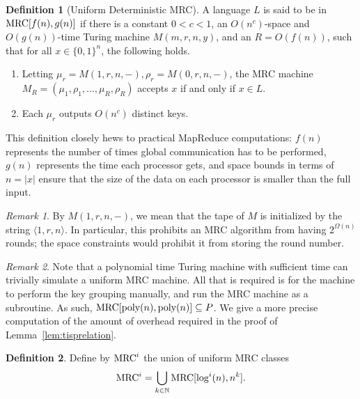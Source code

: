 \documentclass[11pt]{article}
\theoremstyle{definition}
\newtheorem{defn}{Definition}
\theoremstyle{remark}
\newtheorem{remark}{Remark}
\newcommand{\N}{\mathbb{N}}
\newcommand{\mrc}{\textup{MRC}}
\begin{document}
\begin{defn}[Uniform Deterministic MRC]

A language $L$ is said to be in $\mrc[f(n),g(n)]$ if there is a constant $0 < c
< 1$, an $O(n^c)$-space and $O(g(n))$-time Turing machine $M(m, r, n, y)$, and
an $R = O(f(n))$, such that for all $x \in \{ 0,1 \}^n$, the following holds.

\begin{enumerate}
\item Letting $\mu_r = M(1, r, n, -), \rho_r = M(0, r, n, -)$, the MRC machine
$M_R = (\mu_1, \rho_1, \dots, \mu_R, \rho_R)$ accepts $x$ if and only if $x \in
L$.

\item Each $\mu_r$ outputs $O(n^c)$ distinct keys.
\end{enumerate}

\end{defn}

This definition closely hews to practical MapReduce computations:  $f(n)$
represents the number of times global communication has to be performed, $g(n)$
represents the  time each processor gets, and space bounds in terms of $n =
|x|$ ensure that the size of the data on each processor is smaller than the
full input.

\begin{remark}
By $M(1, r, n, -)$, we mean that the tape of $M$ is initialized by the string
$\langle 1, r, n \rangle$. In particular, this prohibits an MRC algorithm from
having $2^{\Omega(n)}$ rounds; the space constraints would prohibit it from
storing the round number.
\end{remark}

\begin{remark}\label{remark:timebound}
Note that a polynomial time Turing machine with sufficient time can trivially
simulate a uniform MRC machine. All that is required is for the machine to
perform the key grouping manually, and run the MRC machine as a subroutine. As
such, $\mrc[\text{poly}(n), \text{poly}(n)] \subseteq P$. We give a more precise
computation of the amount of overhead required in the proof of
Lemma~\ref{lem:tisprelation}.
\end{remark}


\begin{defn}
Define by $\mrc^i$ the union of uniform MRC classes
\[
   \mrc^i = \bigcup_{k\in\N}\mrc[\log^i(n),n^k].
\]
\end{defn}
\end{document}
